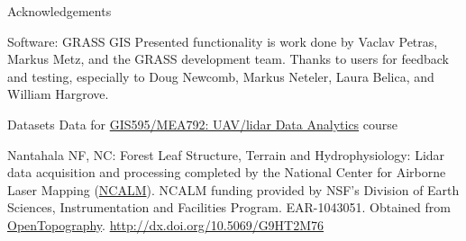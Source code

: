 \documentclass[xcolor={dvipsnames,usenames},beamer,aspectratio=169]{beamer}
\begin{document}
\begin{frame}{Acknowledgements}

\begin{block}{Software: GRASS GIS}
Presented functionality is work done by Vaclav Petras, Markus Metz, and the GRASS development team.
Thanks to users for feedback and testing, especially to
Doug Newcomb, Markus Neteler, Laura Belica, and William Hargrove.
\end{block}

\begin{block}{Datasets}
\footnotesize
Data for
\href{http://ncsu-osgeorel.github.io/uav-lidar-analytics-course/}%
  {GIS595/MEA792: UAV/lidar Data Analytics} course

\smallskip

Nantahala NF, NC: Forest Leaf Structure, Terrain and Hydrophysiology:
Lidar data acquisition and processing completed
by the National Center for Airborne Laser Mapping (\href{http://www.ncalm.org}{NCALM}).
NCALM funding provided by NSF's Division of Earth Sciences, Instrumentation and Facilities Program.
EAR-1043051.
Obtained from \href{http://www.opentopography.org/}{OpenTopography}.
\url{http://dx.doi.org/10.5069/G9HT2M76}
\end{block}

\end{frame}
\end{document}
